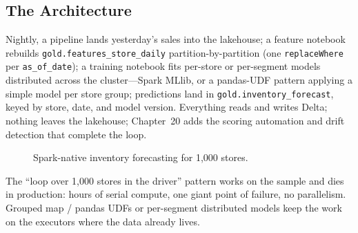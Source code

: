 \subsection{The Architecture}
Nightly, a pipeline lands yesterday's sales into the lakehouse; a feature notebook rebuilds \texttt{gold.features\_store\_daily} partition-by-partition (one \texttt{replaceWhere} per \texttt{as\_of\_date}); a training notebook fits per-store or per-segment models distributed across the cluster---Spark MLlib, or a pandas-UDF pattern applying a simple model per store group; predictions land in \texttt{gold.inventory\_forecast}, keyed by store, date, and model version. Everything reads and writes Delta; nothing leaves the lakehouse; Chapter~20 adds the scoring automation and drift detection that complete the loop.

\begin{figure}[H]
    \centering
    \caption{Spark-native inventory forecasting for 1,000 stores.}
    \label{fig:chapter17-forecast}
\end{figure}

\begin{pitfall}
The ``loop over 1,000 stores in the driver'' pattern works on the sample and dies in production: hours of serial compute, one giant point of failure, no parallelism. Grouped map / pandas UDFs or per-segment distributed models keep the work on the executors where the data already lives.
\end{pitfall}

